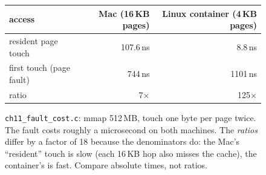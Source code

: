 \begin{figure}[htbp]
\centering
\begin{tabular}{lrr}
\toprule
access & Mac (16\,KB pages) & Linux container (4\,KB pages) \\
\midrule
resident page touch      & 107.6\,ns & 8.8\,ns \\
first touch (page fault) & 744\,ns   & 1101\,ns \\
\midrule
ratio                    & 7$\times$ & 125$\times$ \\
\bottomrule
\end{tabular}
\caption{\texttt{ch11\_fault\_cost.c}: mmap 512\,MB, touch one byte per
page twice. The fault costs roughly a microsecond on both machines. The
\emph{ratios} differ by a factor of 18 because the denominators do:
the Mac's ``resident'' touch is slow (each 16\,KB hop also misses the
cache), the container's is fast. Compare absolute times, not ratios.}
\label{fig:faultcurve11}
\end{figure}

